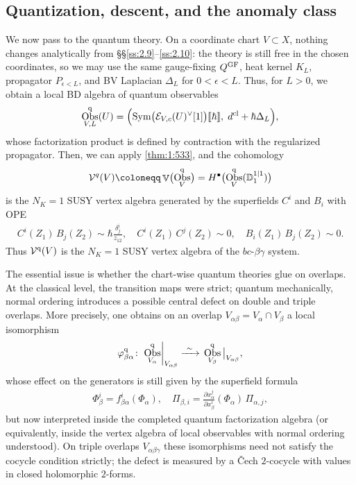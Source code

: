 \documentclass[final,reqno]{amsart}
\numberwithin{equation}{section}
\theoremstyle{definition}
\newcommand{\bl}{\bullet}
\newcommand{\ep}{\epsilon}
\newcommand{\ceq}{\coloneqq} %
\newcommand{\xrr}[1]{\xrightarrow{\ #1 \ }{}}
\newcommand{\lsto}{\xrr{\sim}}
\newcommand{\q}{\textup{q}}
\newcommand{\GF}{\textup{GF}}
\newcommand{\tcl}{\textup{cl}}
\newcommand{\sD}{\mathbb{D}^{1|1}}
\newcommand{\clE}{\mathcal{E}}
\newcommand{\clV}{\mathcal{V}}
\newcommand{\pd}{\partial}
\newcommand{\dbr}[1]{\llbracket #1 \rrbracket} %
\newcommand{\qObs}[1]{\mathop{\Obs^{\textup{q}}_{#1}}}
\newcommand{\rst}[2]{\left. #1 \right|_{#2}}
\DeclareMathOperator{\bbV}{\mathbb{V}}
\DeclareMathOperator{\Sym}{Sym}
\DeclareMathOperator{\Obs}{Obs}
\begin{document}
\subsection{Quantization, descent, and the anomaly class}
\label{ss:3.4}

We now pass to the quantum theory. 
On a coordinate chart $V \subset X$, 
nothing changes analytically from \S\S\ref{ss:2.9}--\ref{ss:2.10}: 
the theory is still free in the chosen coordinates, 
so we may use the same gauge-fixing $Q^{\GF}$, heat kernel $K_L$, 
propagator $P_{\ep<L}$, and BV Laplacian $\Delta_L$ for $0<\ep<L$. 
Thus, for $L>0$, we obtain a local BD algebra of quantum observables
\begin{align}\label{eq:3.4-quantum-local}
 \qObs{V,L}(U) = \Bigl( \Sym\bigl(\clE_{V,c}(U)^\vee[1]\bigr)\dbr{\hbar}, \; 
                        d^{\tcl}+\hbar\Delta_L \Bigr),
\end{align}
whose factorization product is defined 
by contraction with the regularized propagator. 
Then, we can apply \cref{thm:1:533}, and the cohomology
\begin{align}\label{eq:3:clVqV}
 \clV^q(V) \ceq \bbV\bigl(\qObs{V}\bigr) = H^{\bl}\bigl(\qObs{V}(\sD_1)\bigr)
\end{align}
is the $N_K=1$ SUSY vertex algebra generated by 
the superfields $C^i$ and $B_i$ with OPE
\begin{align}\label{eq:3:OPE}
 C^i(Z_1)\,B_j(Z_2) \sim \hbar \frac{\delta^i_j}{z_{12}}, \quad
 C^i(Z_1)\,C^j(Z_2) \sim 0, \quad
 B_i(Z_1)\,B_j(Z_2) \sim 0.
\end{align}
Thus $\clV^{\q}(V)$ is the $N_K=1$ SUSY vertex algebra of 
the $bc$-$\beta\gamma$ system. %

The essential issue is whether the chart-wise quantum theories glue on overlaps. 
At the classical level, the transition maps were strict; 
quantum mechanically, normal ordering introduces a possible central defect 
on double and triple overlaps. 
More precisely, one obtains on an overlap $V_{\alpha\beta}=V_\alpha \cap V_\beta$ 
a local isomorphism
\begin{align}\label{eq:3:varphi}
 \varphi^{\q}_{\beta\alpha}\colon 
 \rst{\qObs{V_\alpha}}{    V_{\alpha\beta}} \lsto 
      \qObs{V_\beta}\big|_{V_{\alpha\beta}},
\end{align}
whose effect on the generators is still given by the superfield formula
\begin{align}\label{eq:3:qch}
 \Phi^i_\beta  = f^i_{\beta\alpha}(\Phi_\alpha), \quad
 \Pi_{\beta,i} = 
 \frac{\pd x^j_\alpha}{\pd x^i_\beta}(\Phi_\alpha)\,\Pi_{\alpha,j},
\end{align}
but now interpreted inside the completed quantum factorization algebra 
(or equivalently, inside the vertex algebra of local observables 
 with normal ordering understood). 
On triple overlaps $V_{\alpha\beta\gamma}$ these isomorphisms need not satisfy
the cocycle condition strictly; the defect is measured by 
a \v{C}ech $2$-cocycle with values in closed holomorphic $2$-forms.
\end{document}
